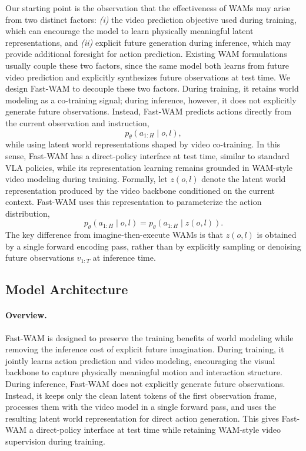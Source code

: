\documentclass{article}
\begin{document}
Our starting point is the observation that the effectiveness of WAMs may arise from two distinct factors: \emph{(i)} the video prediction objective used during training, which can encourage the model to learn physically meaningful latent representations, and \emph{(ii)} explicit future generation during inference, which may provide additional foresight for action prediction. Existing WAM formulations usually couple these two factors, since the same model both learns from future video prediction and explicitly synthesizes future observations at test time. We design Fast-WAM to decouple these two factors. During training, it retains world modeling as a co-training signal; during inference, however, it does not explicitly generate future observations. Instead, Fast-WAM predicts actions directly from the current observation and instruction,
\begin{equation}
    p_\theta(a_{1:H} \mid o, l),
\end{equation}
while using latent world representations shaped by video co-training. In this sense, Fast-WAM has a direct-policy interface at test time, similar to standard VLA policies, while its representation learning remains grounded in WAM-style video modeling during training. Formally, let $z(o, l)$ denote the latent world representation produced by the video backbone conditioned on the current context. Fast-WAM uses this representation to parameterize the action distribution,
\begin{equation}
    p_\theta(a_{1:H} \mid o, l)
    =
    p_\theta(a_{1:H} \mid z(o, l)).
\end{equation}
The key difference from imagine-then-execute WAMs is that $z(o, l)$ is obtained by a single forward encoding pass, rather than by explicitly sampling or denoising future observations $v_{1:T}$ at inference time.

\subsection{Model Architecture}

\paragraph{Overview.}
Fast-WAM is designed to preserve the training benefits of world modeling while removing the inference cost of explicit future imagination. During training, it jointly learns action prediction and video modeling, encouraging the visual backbone to capture physically meaningful motion and interaction structure. During inference, Fast-WAM does not explicitly generate future observations. Instead, it keeps only the clean latent tokens of the first observation frame, processes them with the video model in a single forward pass, and uses the resulting latent world representation for direct action generation. This gives Fast-WAM a direct-policy interface at test time while retaining WAM-style video supervision during training.
\end{document}
